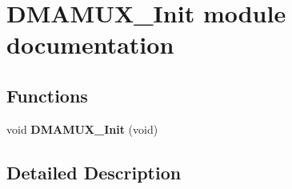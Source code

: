 \hypertarget{group___d_m_a_m_u_x___init__module}{}\section{D\+M\+A\+M\+U\+X\+\_\+\+Init module documentation}
\label{group___d_m_a_m_u_x___init__module}
\subsection*{Functions}
\begin{DoxyCompactItemize}
\item 
void {\bfseries D\+M\+A\+M\+U\+X\+\_\+\+Init} (void)\hypertarget{group___d_m_a_m_u_x___init__module_ga84786b6412d11e8022b2d4bac84d3e22}{}\label{group___d_m_a_m_u_x___init__module_ga84786b6412d11e8022b2d4bac84d3e22}

\end{DoxyCompactItemize}


\subsection{Detailed Description}
